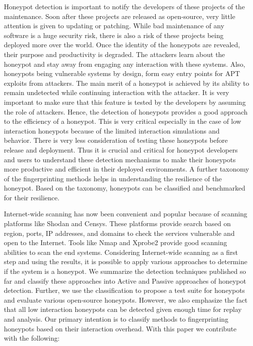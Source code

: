 Honeypot detection is important to notify the developers of these projects of the maintenance. Soon after these projects are released as open-source, very little attention is given to updating or patching. While bad maintenance of any software is a huge security risk, there is also a risk of these projects being deployed more over the world. Once the identity of the honeypots are revealed, their purpose and productivity is degraded. The attackers learn about the honeypot and stay away from engaging any interaction with these systems. Also, honeypots being vulnerable systems by design, form easy entry points for APT exploits from attackers. The main merit of a honeypot is achieved by its ability to remain undetected while continuing interaction with the attacker. It is very important to make sure that this feature is tested by the developers by assuming the role of attackers. Hence, the detection of honeypots provides a good approach to the efficiency of a honeypot. This is very critical especially in the case of low interaction honeypots because of the limited interaction simulations and behavior. There is very less consideration of testing these honeypots before release and deployment. Thus it is crucial and critical for honeypot developers and users to understand these detection mechanisms to make their honeypots more productive and efficient in their deployed environments. A further taxonomy of the fingerprinting methods helps in understanding the resilience of the honeypot. Based on the taxonomy, honeypots can be classified and benchmarked for their resilience. 


Internet-wide scanning has now been convenient and popular because of scanning platforms like Shodan and Censys. These platforms provide search based on region, ports, IP addresses, and domains to check the services vulnerable and open to the Internet. Tools like Nmap \cite{NMap} and Xprobe2 provide good scanning abilities to scan the end systems. Considering Internet-wide scanning as a first step and using the results, it is possible to apply various approaches to determine if the system is a honeypot. We summarize the detection techniques published so far and classify these approaches into Active and Passive approaches of honeypot detection. Further, we use the classification to propose a test suite for honeypots and evaluate various open-source honeypots. However, we also emphasize the fact that all low interaction honeypots can be detected given enough time for replay and analysis. Our primary intention is to classify methods to fingerprinting honeypots based on their interaction overhead. With this paper we contribute with the following:

